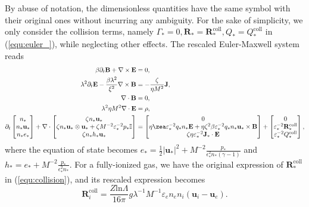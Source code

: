 \documentclass{article}
\begin{document}
By abuse of notation, the dimensionless quantities have the same symbol with their original ones without incurring any ambiguity. For the sake of simplicity, we only consider the collision terms, namely $\Gamma_* = 0, \mathbf{R}_* = \mathbf{R}_*^\text{coll}, Q_* = Q_*^\text{coll}$ in (\ref{equ:euler_}), while neglecting other effects. The rescaled Euler-Maxwell system reads
\begin{align}
    \beta \partial_t \mathbf{B} + \nabla \times \mathbf{E} &= 0, \label{equ:maxwell_faraday_rescalling} \\ 
    \lambda^2 \partial_t \mathbf{E} - \frac{\beta \lambda^2}{\xi^2}\nabla \times \mathbf{B} &= - \frac{\zeta}{\eta M^2}\mathbf{J}, \label{equ:maxwell_ampere_rescalling} \\
    \nabla \cdot \mathbf{B} &= 0,  \label{equ:maxwell_gauss_B_rescalling}\\
    \lambda^2 \eta M^2 \nabla \cdot \mathbf{E} &= \rho, \label{equ:maxwell_gauss_D_rescalling} \\
    \partial_t
    \begin{bmatrix}
    n_* \\
    n_* \mathbf{u}_* \\
    n_* e_*
    \end{bmatrix}
    + \nabla \cdot
    \begin{bmatrix}
    \zeta n_* \mathbf{u}_* \\
    \zeta n_* \mathbf{u}_* \otimes \mathbf{u}_* + \zeta M^{-2} \varepsilon_*^{-2} p_*\mathbb{I} \\
    \zeta n_* h_* \mathbf{u}_*
    \end{bmatrix}
    &=
    \begin{bmatrix}
    0 \\
    \eta \zea \varepsilon_*^{-2} q_* n_*\mathbf{E} + \eta \zeta^2 \beta \varepsilon_*^{-2} q_* n_* \mathbf{u}_* \times \mathbf{B} \\
    \zeta \eta \varepsilon_*^{-2} \mathbf{J}_* \cdot \mathbf{E}
    \end{bmatrix} +
    \begin{bmatrix}
    0 \\
    \varepsilon_*^{-2}\mathbf{R}_*^{\text{coll}} \\
    \varepsilon_*^{-2}Q_*^{\text{coll}} 
    \end{bmatrix}, \label{equ:euler_rescalling}
\end{align}
where the equation of state becomes $e_* = \frac{1}{2}|\mathbf{u_*}|^2 + M^{-2}\frac{p_*}{\epsilon^2_* n_* (\gamma - 1)}$ and $h_* = e_* + M^{-2}\frac{p_*}{\epsilon^2_* n_*}$. For a fully-ionized gas, we have the original expression of $\mathbf{R}_*^{\text{coll}}$ in (\ref{equ:collision}), and its rescaled expression becomes
\begin{equation*}
    \mathbf{R}_i^{\text{coll}} = \frac{Z\text{ln}\Lambda}{16\pi}g\lambda^{-1}M^{-1}\varepsilon_en_en_i(\mathbf{u}_i - \mathbf{u}_e). 
\end{equation*}
\end{document}
